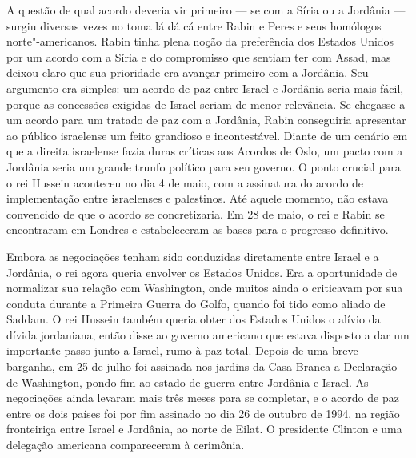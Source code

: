 A questão de qual acordo deveria vir primeiro --- se com a Síria ou a
Jordânia --- surgiu diversas vezes no toma lá dá cá entre Rabin e Peres e
seus homólogos norte"-americanos. Rabin tinha plena noção da preferência
dos Estados Unidos por um acordo com a Síria e do compromisso que
sentiam ter com Assad, mas deixou claro que sua prioridade era avançar
primeiro com a Jordânia. Seu argumento era simples: um acordo de paz
entre Israel e Jordânia seria mais fácil, porque as concessões exigidas
de Israel seriam de menor relevância. Se chegasse a um acordo para um
tratado de paz com a Jordânia, Rabin conseguiria apresentar ao público
israelense um feito grandioso e incontestável. Diante de um cenário em
que a direita israelense fazia duras críticas aos Acordos de Oslo, um
pacto com a Jordânia seria um grande trunfo político para seu governo. O
ponto crucial para o rei Hussein aconteceu no dia 4 de maio, com a assinatura do
acordo de implementação entre israelenses e palestinos. Até aquele
momento, não estava convencido de que o acordo se concretizaria. 
Em 28 de maio, o rei e Rabin se
encontraram em Londres e estabeleceram as bases para o progresso
definitivo.

Embora as negociações tenham sido conduzidas diretamente entre Israel e
a Jordânia, o rei agora queria envolver os Estados Unidos. Era a
oportunidade de normalizar sua relação com Washington, onde muitos ainda
o criticavam por sua conduta durante a Primeira Guerra do Golfo, quando
foi tido como aliado de Saddam. O rei Hussein também queria obter dos
Estados Unidos o alívio da dívida jordaniana, então disse ao governo
americano que estava disposto a dar um importante passo junto a Israel,
rumo à paz total. Depois de uma breve barganha, em 25 de julho foi
assinada nos jardins da Casa Branca a Declaração de Washington, pondo
fim ao estado de guerra entre Jordânia e Israel. As negociações ainda
levaram mais três meses para se completar, e o acordo de paz entre os
dois países foi por fim assinado no dia 26 de outubro de 1994, na região
fronteiriça entre Israel e Jordânia, ao norte de Eilat. O presidente
Clinton e uma delegação americana compareceram à cerimônia.

